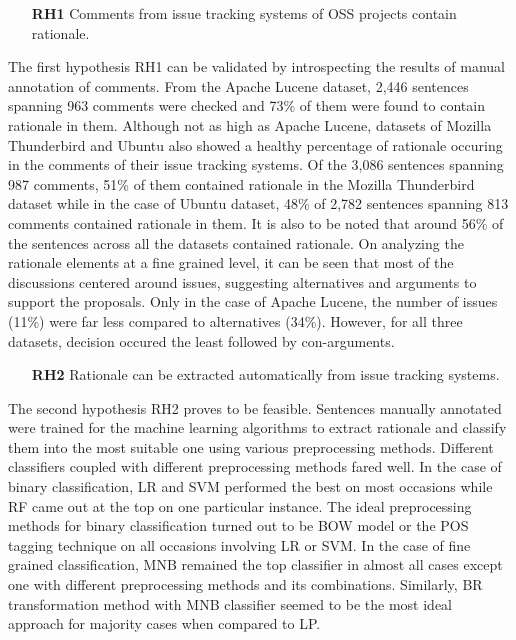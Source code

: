 \documentclass[a4paper,12pt,twoside]{report}
\begin{document}
\begin{itemize}
\item[\textbf{RH1}] Comments from issue tracking systems of \acs{OSS} projects contain rationale.
\end{itemize}
The first hypothesis RH1 can be validated by introspecting the results of manual annotation of comments. From the Apache Lucene dataset, 2,446 sentences spanning 963 comments were checked and 73\% of them were found to contain rationale in them. Although not as high as Apache Lucene, datasets of Mozilla Thunderbird and Ubuntu also showed a healthy percentage of rationale occuring in the comments of their issue tracking systems. Of the 3,086 sentences spanning 987 comments, 51\% of them contained rationale in the Mozilla Thunderbird dataset while in the case of Ubuntu dataset, 48\% of 2,782 sentences spanning 813 comments contained rationale in them. It is also to be noted that around 56\% of the sentences across all the datasets contained rationale. On analyzing the rationale elements at a fine grained level, it can be seen that most of the discussions centered around issues, suggesting alternatives and arguments to support the proposals. Only in the case of Apache Lucene, the number of issues (11\%) were far less compared to alternatives (34\%). However, for all three datasets, decision occured the least followed by con-arguments. 

\begin{itemize}
\item[\textbf{RH2}] Rationale can be extracted automatically from issue tracking systems.
\end{itemize}
The second hypothesis RH2 proves to be feasible. Sentences manually annotated were trained for the machine learning algorithms to extract rationale and classify them into the most suitable one using various preprocessing methods. Different classifiers coupled with different preprocessing methods fared well. In the case of binary classification, \acs{LR} and \acs{SVM} performed the best on most occasions while \acs{RF} came out at the top on one particular instance. The ideal preprocessing methods for binary classification turned out to be \acs{BOW} model or the \acs{POS} tagging technique on all occasions involving \acs{LR} or \acs{SVM}. In the case of fine grained classification, \acs{MNB} remained the top classifier in almost all cases except one with different preprocessing methods and its combinations. Similarly, \acs{BR} transformation method with \acs{MNB} classifier seemed to be the most ideal approach for majority cases when compared to \acs{LP}. 
\end{document}
